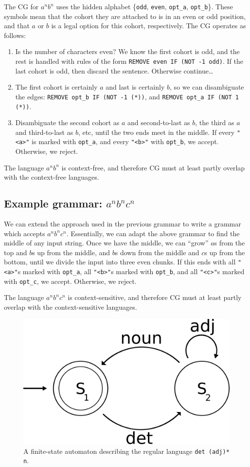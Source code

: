\documentclass[11pt]{article}
\def\t#1{\texttt{#1}}
\begin{document}
The CG for $a^nb^n$ uses the hidden alphabet \{\t{odd}, \t{even}, \t{opt\_a},
\t{opt\_b}\}. These symbols mean that the cohort they are attached to is in an
even or odd position, and that $a$ or $b$ is a legal option for this cohort,
respectively. The CG operates as follows: 
\begin{enumerate}
\item
  Is the number of characters even? We know the first cohort is odd, and the
  rest is handled with rules of the form \t{REMOVE even IF (NOT -1 odd)}. If the
  last cohort is odd, then discard the sentence. Otherwise continue\dots
\item
  The first cohort is certainly $a$ and last is certainly $b$, so we can
  disambiguate the edges: 
  \t{REMOVE opt\_b IF (NOT -1 (*))}, and \t{REMOVE opt\_a IF (NOT 1 (*))}. 
\item
  Disambiguate the second cohort as $a$ and second-to-last as $b$, the third as
  $a$ and third-to-last as $b$, etc, until the two ends meet in the middle. If
  every \t{"<a>"} is marked with \t{opt\_a}, and every \t{"<b>"} with
  \t{opt\_b}, we accept. Otherwise, we reject.  
\end{enumerate}
The language $a^nb^n$ is context-free, and therefore CG must at least partly
overlap with the context-free languages.


\subsection{Example grammar: $a^nb^nc^n$}
We can extend the approach used in the previous grammar to write a grammar which
accepts $a^nb^nc^n$. Essentially, we can adapt the above grammar to find the
middle of any input string. Once we have the middle, we can ``grow'' $a$s from
the top and $b$s up from the middle, and $b$s down from the middle and $c$s up
from the bottom, until we divide the input into three even chunks.
If this ends with all \t{"<a>"}s marked with \t{opt\_a}, all \t{"<b>"}s marked
with \t{opt\_b}, and all \t{"<c>"}s marked with \t{opt\_c}, we accept.
Otherwise, we reject.

The language $a^nb^nc^n$ is context-sensitive, and therefore CG must at least
partly overlap with the context-sensitive languages. 
%
\begin{figure}[t]
  \centering
  \includegraphics[width=0.6\linewidth]{fsa.png}
  \caption{A finite-state automaton describing the regular language \t{det
      (adj)* n}.}
 \label{fig:fsa}
\end{figure}
\end{document}
